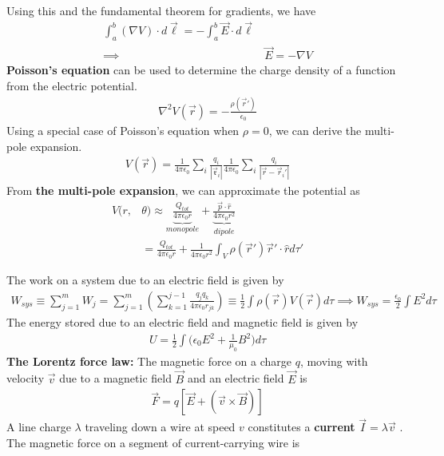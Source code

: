 \begin{multicols}{2}
\begin{align}
\end{align} 
Using this and the fundamental theorem for gradients, we have
\begin{align}
	\int_{a}^{b}(\nabla V)\cdot d\vec{\ell}=-\int_{a}^{b}\vec{E}\cdot d\vec{\ell} \\ \implies &\vec{E} = -\nabla V
\end{align} 
\textbf{Poisson's equation} can be used to determine the charge density of a function from the electric potential. 
\begin{align}
	\nabla^2 V(\vec{r}) = -\frac{\rho(\vec{r}')}{\epsilon_0}
\end{align} 
Using a special case of Poisson's equation when $\rho =0$, we can derive the multi-pole expansion.
\begin{align}
	V(\vec{r}) = \frac{1}{4\pi\epsilon_0}\sum_{i}\frac{q_i}{|\vec{\mathfrak{r}}_i|}\frac{1}{4\pi\epsilon_0}\sum_{i}\frac{q_i}{|\vec{r}-\vec{r}_i'|}
\end{align}
From \textbf{the multi-pole expansion}, we can approximate the potential as
\begin{align}
	V(r,&\theta) \approx \underbrace{\frac{Q_{tot}}{4\pi\epsilon_0 r}}_{monopole} + \underbrace{\frac{\vec{p} \cdot \hat{r}}{4\pi\epsilon_0 r^2}}_{dipole} \\ &= \frac{Q_{tot}}{4\pi\epsilon_0 r} + \frac{1}{4\pi\epsilon_0r^2}\int_V \rho(\vec{r}')\vec{r}'\cdot \hat{r} d\tau'
\end{align}
\end{multicols}
The work on a system due to an electric field is given by
\begin{align}
	W_{sys} \equiv \sum_{j=1}^{m} W_j= \sum_{j=1}^{m} \left(\sum_{k=1}^{j-1} \frac{q_jq_k}{4\pi\epsilon_0r_{jk}}\right) \equiv \frac{1}{2}\int \rho(\vec{r})V(\vec{r})d\tau \implies W_{sys}= \frac{\epsilon_0}{2}\int E^2 d\tau
\end{align}
The energy stored due to an electric field and magnetic field is given by
\begin{align}
	U= \frac{1}{2}\int \bigg(\epsilon_0E^2+\frac{1}{\mu_0}B^2\bigg) d\tau
\end{align}
\textbf{The Lorentz force law:} The magnetic force on a charge $q$, moving with velocity $\vec{v}$ due to a magnetic field $\vec{B}$ and an electric field $\vec{E}$ is
\begin{align}
	\vec{F} = q[\vec{E}+(\vec{v}\times \vec{B})]
\end{align}
A line charge $\lambda$ traveling down a wire at speed $v$ constitutes a \textbf{current} $\vec{I}=\lambda \vec{v}$ \cite{bib:Griffiths}. The magnetic force on a segment of current-carrying wire is
